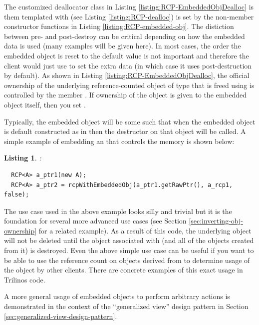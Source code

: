\documentclass[pdf,ps2pdf,11pt]{SANDreport}
\newtheorem{listing}{Listing}
\begin{document}
The customized deallocator class in Listing
{}\ref{listing:RCP-EmbeddedObjDealloc} is them templated with
{} (see Listing {}\ref{listing:RCP-dealloc}) is
set by the non-member constructor functions in Listing
{}\ref{listing:RCP-embedded-obj}.  The distiction between pre- and
post-destroy can be critical depending on how the embedded data is
used (many examples will be given here).  In most cases, the order the
embedded object is reset to the default value is not important and
therefore the client would just use {} 
to set the extra data (in which case it uses post-destruction by
default).  As shown in Listing {}\ref{listing:RCP-EmbeddedObjDealloc},
the official ownership of the underlying reference-counted object of
type {} that is freed using {} is
controlled by the {} member {}.
If ownership of the object is given to the embedded object itself,
then you set {}.

Typically, the embedded object will be some {} such that
when the embedded object is default constructed as in
{} then the destructor on that object
will be called.  A simple example of embedding an {} that
controls the memory is shown below:

\begin{listing}: \\
{\small\begin{verbatim}
  RCP<A> a_ptr1(new A);
  RCP<A> a_ptr2 = rcpWithEmbeddedObj(a_ptr1.getRawPtr(), a_rcp1, false);
\end{verbatim}}
\end{listing}

The use case used in the above example looks silly and trivial but it
is the foundation for several more advanced use cases (see Section
{}\ref{sec:inverting-obj-ownership} for a related example).  As a
result of this code, the underlying {} object will not be
deleted until the {} object associated with
{} (and all of the {} objects created from
it) is destroyed.  Even the above simple use case can be useful if you
want to be able to use the reference count on {} objects
derived from {} to determine usage of the object by
other clients.  There are concrete examples of this exact usage in
Trilinos code.

A more general usage of embedded objects to perform arbitrary actions
is demonstrated in the context of the ``generalized view'' design
pattern in Section {}\ref{sec:generalized-view-design-pattern}.
\end{document}
